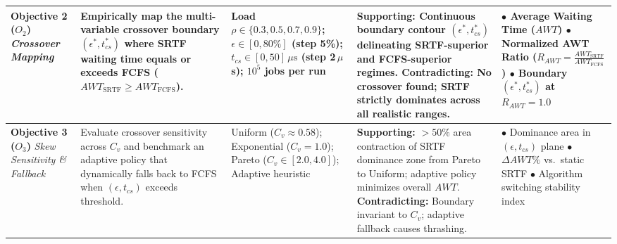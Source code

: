 \documentclass[11pt]{article}
\begin{document}
{{\begin{tabular}{|>{\raggedright\arraybackslash}p{2.0cm}|>{\raggedright\arraybackslash}p{3.5cm}|>{\raggedright\arraybackslash}p{2.6cm}|>{\raggedright\arraybackslash}p{4.5cm}|>{\raggedright\arraybackslash}p{3.3cm}|}
    \textbf{Objective 2 ($O_2$)} \newline \textit{Crossover Mapping} & 
    Empirically map the multi-variable crossover boundary $(\epsilon^*, t_{cs}^*)$ where SRTF waiting time equals or exceeds FCFS ($AWT_{\text{SRTF}} \ge AWT_{\text{FCFS}}$). & 
    Load $\rho \in \{0.3, 0.5, 0.7, 0.9\}$; \newline
    $\epsilon \in [0, 80\%]$ (step 5\%); \newline
    $t_{cs} \in [0, 50]\,\mu\text{s}$ (step 2\,$\mu$s); \newline
    $10^5$ jobs per run & 
    \textbf{Supporting:} Continuous boundary contour $(\epsilon^*, t_{cs}^*)$ delineating SRTF-superior and FCFS-superior regimes. \newline 
    \textbf{Contradicting:} No crossover found; SRTF strictly dominates across all realistic ranges. & 
    $\bullet$ Average Waiting Time ($AWT$) \newline 
    $\bullet$ Normalized AWT Ratio \newline
    \hspace*{0.8em}($R_{AWT} = \frac{AWT_{\text{SRTF}}}{AWT_{\text{FCFS}}}$) \newline 
    $\bullet$ Boundary $(\epsilon^*, t_{cs}^*)$ at $R_{AWT} = 1.0$ \\
    \hline

    \textbf{Objective 3 ($O_3$)} \newline \textit{Skew Sensitivity \& Fallback} & 
    Evaluate crossover sensitivity across $C_v$ and benchmark an adaptive policy that dynamically falls back to FCFS when $(\epsilon, t_{cs})$ exceeds threshold. & 
    Uniform ($C_v \approx 0.58$); \newline
    Exponential ($C_v = 1.0$); \newline
    Pareto ($C_v \in [2.0, 4.0]$); \newline
    Adaptive heuristic & 
    \textbf{Supporting:} $>50\%$ area contraction of SRTF dominance zone from Pareto to Uniform; adaptive policy minimizes overall $AWT$. \newline 
    \textbf{Contradicting:} Boundary invariant to $C_v$; adaptive fallback causes thrashing. & 
    $\bullet$ Dominance area in $(\epsilon, t_{cs})$ plane \newline 
    $\bullet$ $\Delta AWT\%$ vs.\ static SRTF \newline 
    $\bullet$ Algorithm switching stability index \\
    \hline


\end{tabular}}}
\end{document}

